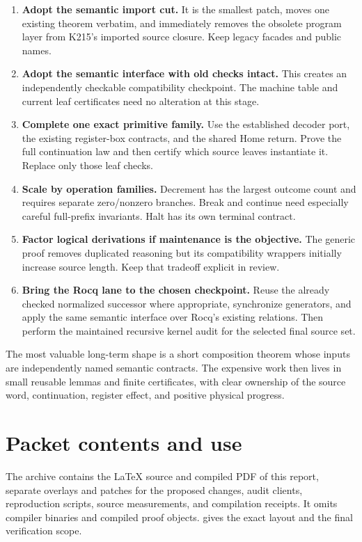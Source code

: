 \documentclass[11pt,letterpaper]{article}
\newcommand{\code}[1]{\texttt{\small\detokenize{#1}}}
\theoremstyle{definition}\newtheorem{definition}[theorem]{Definition}
\begin{document}
\begin{enumerate}
\item \textbf{Adopt the semantic import cut.} It is the smallest patch, moves
one existing theorem verbatim, and immediately removes the obsolete program
layer from K215's imported source closure. Keep legacy facades and public names.
\item \textbf{Adopt the semantic \code{KSim} interface with old checks intact.}
This creates an independently checkable compatibility checkpoint. The machine
table and current leaf certificates need no alteration at this stage.
\item \textbf{Complete one exact primitive family.} Use the established
decoder port, the existing register-box contracts, and the shared Home return.
Prove the full continuation law and then certify which source leaves instantiate
it. Replace only those leaf checks.
\item \textbf{Scale by operation families.} Decrement has the largest outcome
count and requires separate zero/nonzero branches. Break and continue need
especially careful full-prefix invariants. Halt has its own terminal contract.
\item \textbf{Factor logical derivations if maintenance is the objective.}
The generic \code{NamedDerived} proof removes duplicated reasoning but its
compatibility wrappers initially increase source length. Keep that tradeoff
explicit in review.
\item \textbf{Bring the Rocq lane to the chosen checkpoint.} Reuse the already
checked normalized successor where appropriate, synchronize generators, and
apply the same semantic interface over Rocq's existing relations. Then perform
the maintained recursive kernel audit for the selected final source set.
\end{enumerate}

The most valuable long-term shape is a short composition theorem whose inputs
are independently named semantic contracts. The expensive work then lives in
small reusable lemmas and finite certificates, with clear ownership of the
source word, continuation, register effect, and positive physical progress.

\appendix
\section{Packet contents and use}

The archive contains the \LaTeX{} source and compiled PDF of this report,
separate overlays and patches for the proposed changes, audit clients,
reproduction scripts, source measurements, and compilation receipts. It omits
compiler binaries and compiled proof objects. \code{README.md} gives the exact
layout and the final verification scope.
\end{document}
